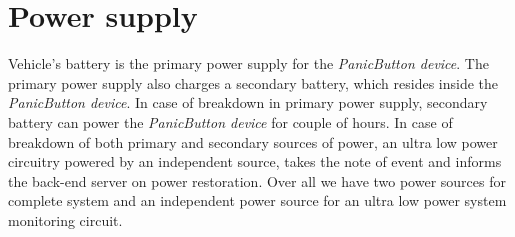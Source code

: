 



\section{Power supply}
Vehicle's battery is the primary power supply for the \emph{PanicButton device}. The primary power supply also charges a secondary battery, which resides inside the \emph{PanicButton device}. In case of breakdown in primary power supply, secondary battery can power the \emph{PanicButton device} for couple of hours. In case of breakdown of both primary and secondary sources of power, an ultra low power circuitry powered by an independent source, takes the note of event and informs the back-end server on power restoration. Over all we have two power sources for complete system and an independent power source for an ultra low power system monitoring circuit.


